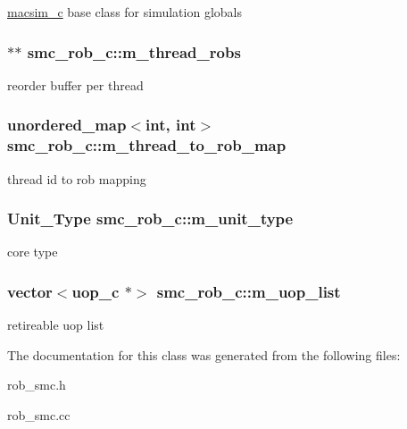 \label{classsmc__rob__c_a8f735f49a88a96ae31045a882dff660d}
\hyperlink{classmacsim__c}{macsim\_\-c} base class for simulation globals \hypertarget{classsmc__rob__c_a158a1f5f7421d05352318865b37e92bc}{
\subsubsection[{m\_\-thread\_\-robs}]{$\ast$$\ast$ {\bf smc\_\-rob\_\-c::m\_\-thread\_\-robs}}}
\label{classsmc__rob__c_a158a1f5f7421d05352318865b37e92bc}
reorder buffer per thread \hypertarget{classsmc__rob__c_a56ba9b44e042ed8f7cb752c1780ddf2e}{
\subsubsection[{m\_\-thread\_\-to\_\-rob\_\-map}]{\setlength{\rightskip}{0pt plus 5cm}unordered\_\-map$<$int, int$>$ {\bf smc\_\-rob\_\-c::m\_\-thread\_\-to\_\-rob\_\-map}}}
\label{classsmc__rob__c_a56ba9b44e042ed8f7cb752c1780ddf2e}
thread id to rob mapping \hypertarget{classsmc__rob__c_a5b6e2bf88b64d1f769654120cd9d1f36}{
\subsubsection[{m\_\-unit\_\-type}]{\setlength{\rightskip}{0pt plus 5cm}Unit\_\-Type {\bf smc\_\-rob\_\-c::m\_\-unit\_\-type}}}
\label{classsmc__rob__c_a5b6e2bf88b64d1f769654120cd9d1f36}
core type \hypertarget{classsmc__rob__c_a27d28e046bd5d8fbc76fefb6ad406423}{
\subsubsection[{m\_\-uop\_\-list}]{\setlength{\rightskip}{0pt plus 5cm}vector$<${\bf uop\_\-c} $\ast$$>$ {\bf smc\_\-rob\_\-c::m\_\-uop\_\-list}}}
\label{classsmc__rob__c_a27d28e046bd5d8fbc76fefb6ad406423}
retireable uop list 

The documentation for this class was generated from the following files:\begin{DoxyCompactItemize}
\item 
rob\_\-smc.h\item 
rob\_\-smc.cc\end{DoxyCompactItemize}
